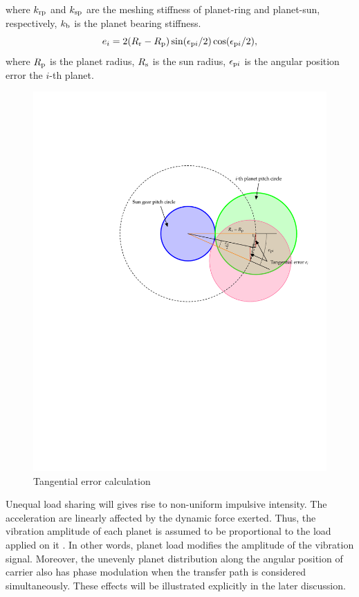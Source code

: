 \documentclass[a4paper,fleqn]{cas-sc}%
\begin{document}
where $k_{\rm rp}$ and $k_{\rm sp}$ are the meshing stiffness of planet-ring and planet-sun, respectively, $k_{\rm b}$ is the planet bearing stiffness.
\begin{equation}
    e_{i}=2(R_{\rm r}-R_{\rm p})\sin(\epsilon_{{\rm p}i}/2)\cos(\epsilon_{{\rm p}i}/2),\label{eq:tangential_error}
\end{equation}
where $R_{\rm p}$ is the planet radius, $R_{\rm s}$ is the sun radius, $\epsilon_{{\rm p}i}$ is the angular position error the $i$-th planet.
\begin{figure}[pos=htbp]
    \centering
    \includegraphics[scale=0.5]{tangential_error.pdf}
    \caption{Tangential error calculation}
    \label{fig:tangential_error}
\end{figure}
\par Unequal load sharing will gives rise to non-uniform impulsive intensity. The acceleration are linearly affected by the dynamic force exerted. Thus, the vibration amplitude of each planet is assumed to be proportional to the load applied on it \cite{Inalpolat2009}. In other words, planet load modifies the amplitude of the vibration signal. Moreover, the unevenly planet distribution along the angular position of carrier also has phase modulation when the transfer path is considered simultaneously. These effects will be illustrated explicitly in the later discussion. 
\end{document}
